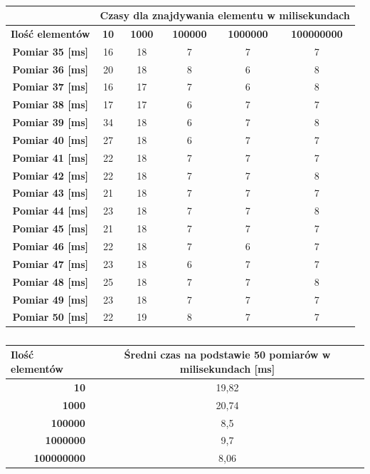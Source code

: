 \documentclass[11pt,a4paper]{article}
\begin{document}
\begin{table}[htbp]
\caption{}
\begin{center}
\begin{tabular}{|c|c|c|c|c|c|}
\hline
\textbf{} & \multicolumn{ 5}{c|}{\textbf{Czasy dla znajdywania elementu w milisekundach}} \\ \hline
\textbf{Ilość elementów} & \textbf{10} & \textbf{1000} & \textbf{100000} & \textbf{1000000} & \textbf{100000000} \\ \hline
\textbf{Pomiar 35 [ms]} & 16 & 18 & 7 & 7 & 7 \\ \hline
\textbf{Pomiar 36 [ms]} & 20 & 18 & 8 & 6 & 8 \\ \hline
\textbf{Pomiar 37 [ms]} & 16 & 17 & 7 & 6 & 8 \\ \hline
\textbf{Pomiar 38 [ms]} & 17 & 17 & 6 & 7 & 7 \\ \hline
\textbf{Pomiar 39 [ms]} & 34 & 18 & 6 & 7 & 8 \\ \hline
\textbf{Pomiar 40 [ms]} & 27 & 18 & 6 & 7 & 7 \\ \hline
\textbf{Pomiar 41 [ms]} & 22 & 18 & 7 & 7 & 7 \\ \hline
\textbf{Pomiar 42 [ms]} & 22 & 18 & 7 & 7 & 8 \\ \hline
\textbf{Pomiar 43 [ms]} & 21 & 18 & 7 & 7 & 7 \\ \hline
\textbf{Pomiar 44 [ms]} & 23 & 18 & 7 & 7 & 8 \\ \hline
\textbf{Pomiar 45 [ms]} & 21 & 18 & 7 & 7 & 7 \\ \hline
\textbf{Pomiar 46 [ms]} & 22 & 18 & 7 & 6 & 7 \\ \hline
\textbf{Pomiar 47 [ms]} & 23 & 18 & 6 & 7 & 7 \\ \hline
\textbf{Pomiar 48 [ms]} & 25 & 18 & 7 & 7 & 8 \\ \hline
\textbf{Pomiar 49 [ms]} & 23 & 18 & 7 & 7 & 7 \\ \hline
\textbf{Pomiar 50 [ms]} & 22 & 19 & 8 & 7 & 7 \\ \hline
\end{tabular}
\end{center}
\label{Wyniki2}
\end{table}

\begin{table}[htbp]
\caption{}
\begin{center}
\begin{tabular}{|r|c|}
\hline
\multicolumn{1}{|l|}{\textbf{Ilość elementów}} & \multicolumn{1}{c|}{\textbf{Średni czas na podstawie 50 pomiarów w milisekundach [ms]}} \\ \hline
\textbf{10} & 19,82 \\ \hline
\textbf{1000} & 20,74 \\ \hline
\textbf{100000} & 8,5 \\ \hline
\textbf{1000000} & 9,7 \\ \hline
\textbf{100000000} & 8,06 \\ \hline
\end{tabular}
\end{center}
\label{Wyniki3}
\end{table}
\end{document}
